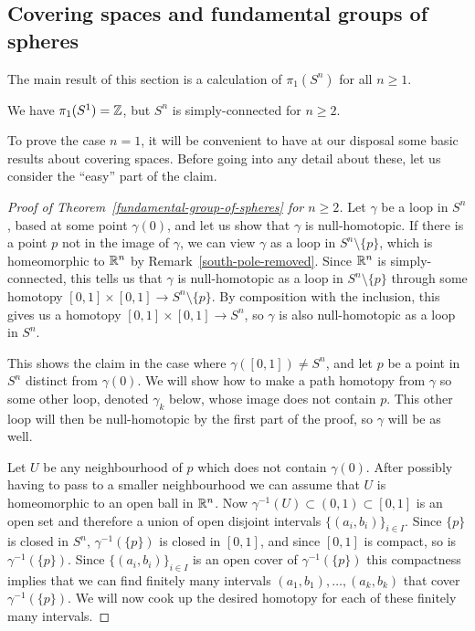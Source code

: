 \subsection{Covering spaces and fundamental groups of spheres}
The main result of this section is a calculation of $\pi_1(S^n)$ for all $n \geq 1$.
\begin{thm}
  \label{fundamental-group-of-spheres}
  We have $\pi_1(S^1) = \mathbb{Z}$, but $S^n$ is simply-connected for $n \geq 2$.
\end{thm}

To prove the case $n = 1$, it will be convenient to have at our disposal some basic results about covering spaces. Before going into any detail about these, let us consider the ``easy'' part of the claim.
\begin{proof}[Proof of Theorem~\ref{fundamental-group-of-spheres} for $n \geq 2$]
  Let $\gamma$ be a loop in $S^n$, based at some point $\gamma(0)$, and let us show that $\gamma$ is null-homotopic. If there is a point $p$ not in the image of $\gamma$, we can view $\gamma$ as a loop in $S^n \setminus \{p\}$, which is homeomorphic to $\mathbb{R}^n$ by Remark~\ref{south-pole-removed}. Since $\mathbb{R}^n$ is simply-connected, this tells us that $\gamma$ is null-homotopic as a loop in $S^n \setminus \{ p \}$ through some homotopy $[0,1] \times [0,1] \to S^n \setminus \{p\}$. By composition with the inclusion, this gives us a homotopy $[0,1] \times [0,1] \to S^n$, so $\gamma$ is also null-homotopic as a loop in $S^n$.
  
  This shows the claim in the case where $\gamma([0,1]) \not= S^n$, and let $p$ be a point in $S^n$ distinct from $\gamma(0)$. We will show how to make a path homotopy from $\gamma$ so some other loop, denoted $\gamma_k$ below, whose image does not contain $p$. This other loop will then be null-homotopic by the first part of the proof, so $\gamma$ will be as well.
  
  Let $U$ be any neighbourhood of $p$ which does not contain $\gamma(0)$. After possibly having to pass to a smaller neighbourhood we can assume that $U$ is homeomorphic to an open ball in $\mathbb{R}^n$. Now $\gamma^{-1}(U) \subset (0,1) \subset [0,1]$ is an open set and therefore a union of open disjoint intervals $\{(a_i,b_i)\}_{i \in I}$. Since $\{p\}$ is closed in $S^n$, $\gamma^{-1}(\{p\})$ is closed in $[0,1]$, and since $[0,1]$ is compact, so is $\gamma^{-1}(\{p\})$. Since $\{(a_i,b_i)\}_{i \in I}$ is an open cover of $\gamma^{-1}(\{p\})$ this compactness implies that we can find finitely many intervals $(a_1,b_1), \dots, (a_k,b_k)$ that cover $\gamma^{-1}(\{p\})$. We will now cook up the desired homotopy for each of these finitely many intervals.
  

\end{proof}
